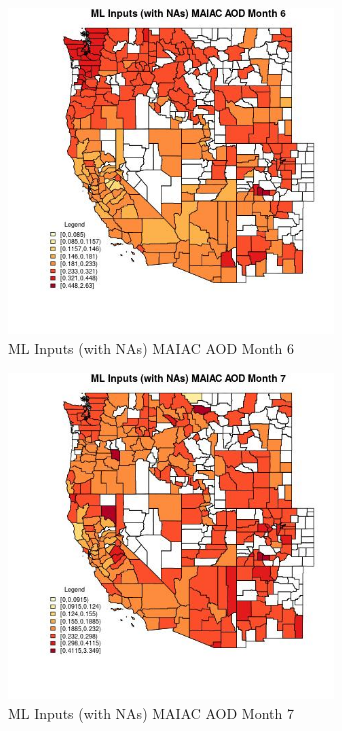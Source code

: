 \begin{figure} 
\centering  
\includegraphics[width=0.77\textwidth]{Code_Outputs/Report_ML_input_PM25_Step4_part_f_de_duplicated_aves_prioritize_24hr_obswNAs_CountyMAIAC_AODmedianMonth6.jpg} 
\caption{\label{fig:Report_ML_input_PM25_Step4_part_f_de_duplicated_aves_prioritize_24hr_obswNAsCountyMAIAC_AODmedianMonth6}ML Inputs (with NAs) MAIAC AOD Month 6} 
\end{figure} 
 

\begin{figure} 
\centering  
\includegraphics[width=0.77\textwidth]{Code_Outputs/Report_ML_input_PM25_Step4_part_f_de_duplicated_aves_prioritize_24hr_obswNAs_CountyMAIAC_AODmedianMonth7.jpg} 
\caption{\label{fig:Report_ML_input_PM25_Step4_part_f_de_duplicated_aves_prioritize_24hr_obswNAsCountyMAIAC_AODmedianMonth7}ML Inputs (with NAs) MAIAC AOD Month 7} 
\end{figure} 
 

